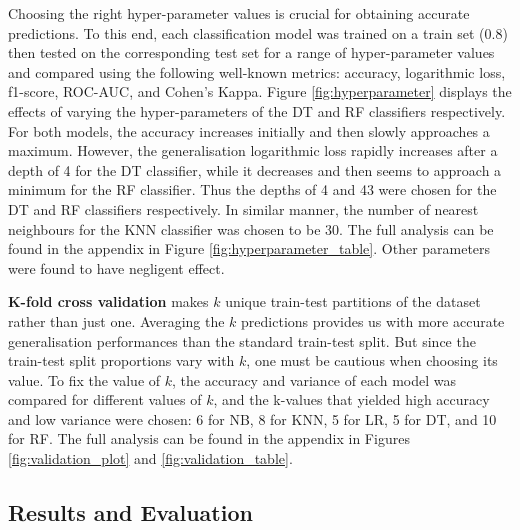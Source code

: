 \documentclass{article}
\begin{document}
Choosing the right hyper-parameter values is crucial for obtaining accurate predictions. To this end, each classification model was trained on a train set (0.8) then tested on the corresponding test set for a range of hyper-parameter values and compared using the following well-known metrics: accuracy, logarithmic loss, f1-score, ROC-AUC, and Cohen's Kappa. Figure \ref{fig:hyperparameter} displays the effects of varying the hyper-parameters of the DT and RF classifiers respectively. For both models, the accuracy increases initially and then slowly approaches a maximum. However, the generalisation logarithmic loss rapidly increases after a depth of 4 for the DT classifier, while it decreases and then seems to approach a minimum for the RF classifier. Thus the depths of 4 and 43 were chosen for the DT and RF classifiers respectively. In similar manner, the number of nearest neighbours for the KNN classifier was chosen to be 30. The full analysis can be found in the appendix in Figure \ref{fig:hyperparameter_table}. Other parameters were found to have negligent effect.



\textbf{K-fold cross validation} makes $k$ unique train-test partitions of the dataset rather than just one. Averaging the $k$ predictions provides us with more accurate generalisation performances than the standard train-test split. But since the train-test split proportions vary with $k$, one must be cautious when choosing its value. To fix the value of $k$, the accuracy and variance of each model was compared for different values of $k$, and the k-values that yielded high accuracy and low variance were chosen: 6 for NB, 8 for KNN, 5 for LR, 5 for DT, and 10 for RF. The full analysis can be found in the appendix in Figures \ref{fig:validation_plot} and \ref{fig:validation_table}.

\subsection{Results and Evaluation}
\end{document}
